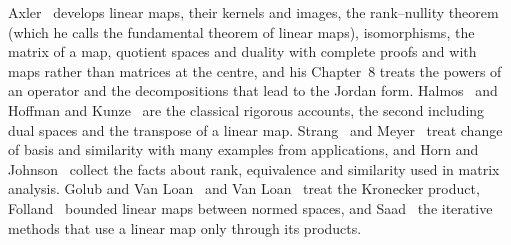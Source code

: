 Axler~\cite[Chap.~3]{axler2024} develops linear maps, their kernels and images, the rank--nullity theorem (which he calls the fundamental theorem of linear maps), isomorphisms, the matrix of a map, quotient spaces and duality with complete proofs and with maps rather than matrices at the centre, and his Chapter~8 treats the powers of an operator and the decompositions that lead to the Jordan form. Halmos~\cite{halmos1958} and Hoffman and Kunze~\cite{hoffman1971} are the classical rigorous accounts, the second including dual spaces and the transpose of a linear map. Strang~\cite{strang2016} and Meyer~\cite{meyer2000} treat change of basis and similarity with many examples from applications, and Horn and Johnson~\cite[Sects.~0.4 and~1.3]{horn2013} collect the facts about rank, equivalence and similarity used in matrix analysis. Golub and Van Loan~\cite{golub2013} and Van Loan~\cite{vanloan2000} treat the Kronecker product, Folland~\cite[Sect.~5.1]{folland1999} bounded linear maps between normed spaces, and Saad~\cite{saad2003} the iterative methods that use a linear map only through its products.

\chapterreferences
